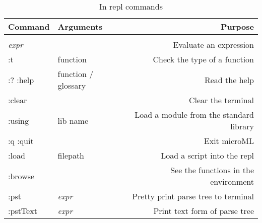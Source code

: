 \begin{table}
    \begin{tabu}{l l r}
            Command & Arguments & Purpose \\
            \hline \\
            \textit{expr} & & Evaluate an expression \\
            :t & function & Check the type of a function \\
            :? :help & function / glossary & Read the help \\
            :clear & & Clear the terminal \\
            :using & lib name & Load a module from the standard library \\
            :q :quit & & Exit microML \\
            :load & filepath & Load a script into the repl \\
            :browse & & See the functions in the environment \\
            :pst & \textit{expr} & Pretty print parse tree to terminal \\
            :pstText & \textit{expr} & Print text form of parse tree \\
    \end{tabu}
\caption{In repl commands}
\label{tabel:repl}
\end{table}
